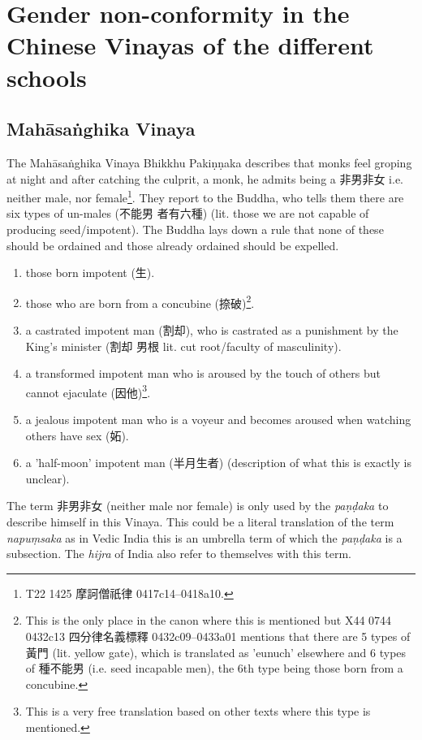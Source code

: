 \section{Gender non-conformity in the Chinese Vinayas of the different schools}
\label{appendix1}

\subsection{Mahāsaṅghika Vinaya}
The Mahāsaṅghika Vinaya Bhikkhu Pakiṇṇaka describes that monks feel groping at night and after catching the culprit, a monk, he admits being a 非男非女 i.e. neither male, nor female\footnote{T22 1425 摩訶僧祇律 0417c14–0418a10.}. They report to the Buddha, who tells them there are six types of un-males (不能男 者有六種) (lit. those we are not capable of producing seed/impotent). The Buddha lays down a rule that none of these should be ordained and those already ordained should be expelled.

\begin{enumerate}
\item those born impotent (生). 
\item those who are born from a concubine (捺破)\footnote{This is the only place in the canon where this is mentioned but X44 0744 0432c13 四分律名義標釋 0432c09–0433a01 mentions that there are 5 types of 黃門 (lit. yellow gate), which is translated as 'eunuch' elsewhere and 6 types of 種不能男 (i.e. seed incapable men), the 6th type being those born from a concubine.}.
\item a castrated impotent man (割却), who is castrated as a punishment by the King's minister (割却 男根 lit. cut root/faculty of masculinity).
\item a transformed impotent man who is aroused by the touch of others but cannot ejaculate (因他)\footnote{This is a very free translation based on other texts where this type is mentioned.}.
\item a jealous impotent man who is a voyeur and becomes aroused when watching others have sex (妬).
\item a 'half-moon' impotent man (半月生者) (description of what this is exactly is unclear).
\end{enumerate}

The term 非男非女 (neither male nor female) is only used by the {\em paṇḍaka} to describe himself in this Vinaya. This could be a literal translation of the term {\em napuṃsaka} as in Vedic India this is an umbrella term of which the {\em paṇḍaka} is a subsection. The {\em hijra} of India also refer to themselves with this term.

